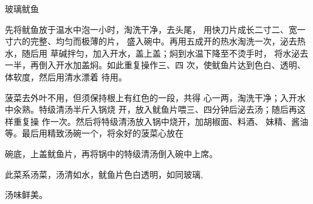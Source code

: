 \begin{recipe}{玻璃鱿鱼}

\ingredients


\cooking

\step 先将鱿鱼放于温水中泡一小时，淘洗干净，去头尾， 用快刀片成长二寸二、宽一寸六的完整、均匀而极薄的片， 盛入碗中。再用五成开的热水淘洗一次，泌去热水，随后用 草碱拌匀，加入开水，盖上盖；焖到水温下降至不烫手时， 将水泌去一半，再倒入开水加盖焖。如此重复操作三、四 次，使鱿鱼片达到色白、透明、体软度，然后用清水漂着 待用。

\step 菠菜去外叶不用，但须保持根上有红色的一段，共得 心一两，淘洗干净；入开水中汆熟。特级清汤半斤入锅烧 开，放入鱿鱼片喂三、四分钟后泌去汤；随后再这样重复操 作一次。然后将特级清汤放入锅中烧开，加胡椒面、料酒、 妹精、酱油等。最后用精致汤碗一个，将汆好的菠菜心放在

碗底，上盖鱿鱼片，再将锅中的特级清汤倒入碗中上席。

\notes

此菜系汤菜，汤清如水，鱿鱼片色白透明，如同玻璃,

汤味鲜美。

\end{recipe}

